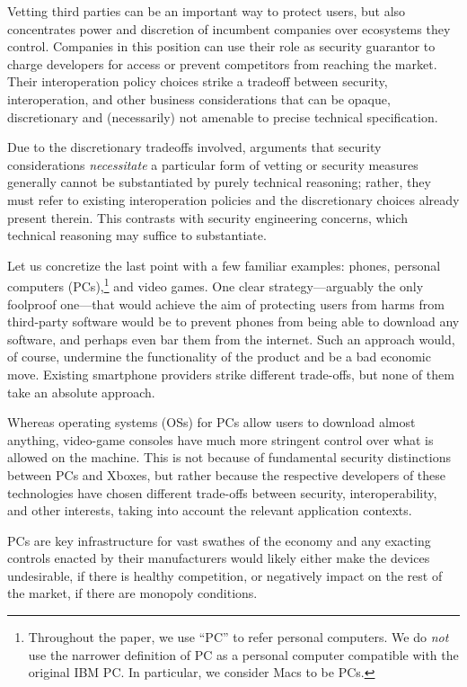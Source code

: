 \documentclass[letterpaper,twocolumn,10pt]{article}
\begin{document}
Vetting third parties can be an important way to protect users, but also concentrates power and discretion of incumbent companies over ecosystems they control.  Companies in this position can use their role as security guarantor to charge developers for access or prevent competitors from reaching the market. Their interoperation policy choices strike a tradeoff between security, interoperation, and other business considerations that can be opaque, discretionary and (necessarily) not amenable to precise technical specification.

Due to the discretionary tradeoffs involved, arguments that security considerations \emph{necessitate} a particular form of vetting or security measures generally cannot be substantiated by purely technical reasoning; rather, they must refer to existing interoperation policies and the discretionary choices already present therein. This contrasts with security engineering concerns, which technical reasoning may suffice to substantiate.

Let us concretize the last point with a few familiar examples: phones, personal computers (PCs),\footnote{Throughout the paper, we use ``PC'' to refer personal computers. We do \emph{not} use the narrower definition of PC as a personal computer compatible with the original IBM PC. In particular, we consider Macs to be PCs.\label{fn:pc}} and video games. One clear strategy---arguably the only foolproof one---that would achieve the aim of protecting users from harms from third-party software would be to prevent phones from being able to download any software, and perhaps even bar them from the internet.  Such an approach would, of course, undermine the functionality of the product and be a bad economic move. Existing smartphone providers strike different trade-offs, but none of them take an absolute approach.


Whereas operating systems (OSs) for PCs  allow users to download almost anything, video-game consoles have much more stringent control over what is allowed on the machine.  This is not because of fundamental security distinctions between PCs and Xboxes, but rather because the respective developers of these technologies have chosen different trade-offs between security, interoperability, and other interests, taking into account the relevant application contexts.

PCs are key infrastructure for vast swathes of the economy and any exacting controls enacted by their manufacturers would likely either make the devices undesirable, if there is healthy competition, or negatively impact on the rest of the market, if there are monopoly conditions. 
\end{document}
